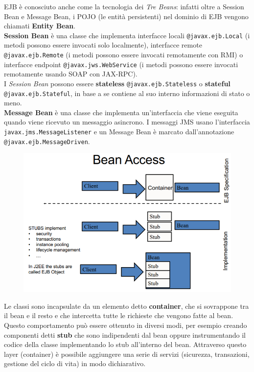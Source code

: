 EJB è conosciuto anche come la tecnologia dei \textit{Tre Beans}: infatti oltre a Session Bean e Message Bean, i POJO (le entità persistenti) nel dominio di EJB vengono chiamati \textbf{Entity Bean}.\\

\textbf{Session Bean} è una classe che implementa interfacce locali \texttt{@javax.ejb.Local} (i metodi possono essere invocati solo localmente), interfacce remote \texttt{@javax.ejb.Remote} (i metodi possono essere invocati remotamente con RMI) o interfacce endpoint  \texttt{@javax.jws.WebService} (i metodi possono essere invocati remotamente usando SOAP con JAX-RPC).\\

I \textit{Session Bean} possono essere \textbf{stateless} \texttt{@javax.ejb.Stateless}  o \textbf{stateful}  \texttt{@javax.ejb.Stateful}, in base a se contiene al suo interno informazioni di stato o meno. \\

\textbf{Message Bean} è una classe che implementa un’interfaccia che viene eseguita quando viene ricevuto un messaggio asincrono.
I messaggi JMS usano l’interfaccia \texttt{javax.jms.MessageListener} e un Message Bean è marcato dall’annotazione \texttt{@javax.ejb.MessageDriven}.

\begin{figure}[H]
    \centering
    \includegraphics[scale=0.6]{Imm/bean-access.png}
\end{figure}

Le classi sono incapsulate da un elemento detto \textbf{container}, che si sovrappone tra il bean e il resto e che intercetta tutte le richieste che vengono fatte al bean.\\
Questo comportamento può essere ottenuto in diversi modi, per esempio creando componenti detti \textbf{stub} che sono indipendenti dal bean oppure instrumentando il codice della classe implementando lo stub all’interno del bean.
Attraverso questo layer (container) è possibile aggiungere una serie di servizi (sicurezza, transazioni, gestione del ciclo di vita) in modo dichiarativo.\\

